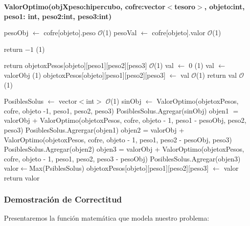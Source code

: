 \documentclass[spanish,12pt]{article}
\begin{document}

\begin{algorithm}[H]{\textbf{ValorOptimo(objXpeso:hipercubo, cofre:vector$<$tesoro$>$, objeto:int, peso1: int, peso2:int, peso3:int)}}
	\begin{algorithmic}[1]
		\State  pesoObj $\gets$ cofre[objeto].peso \Comment $\mathcal{O}$(1)
		\State  pesoVal $\gets$ cofre[objeto].valor \Comment $\mathcal{O}$(1)

			\State return $-1$ \Comment {}(1)

		\EndIf

			\State return objetoxPesos[objeto][peso1][peso2][peso3] \Comment $\mathcal{O}$(1)
		\EndIf
			\State val $\gets$ 0 \Comment {}(1)
				\State val $\gets$ valorObj \Comment {}(1)
				\State objetoxPesos[objeto][peso1][peso2][peso3] $\gets$ val \Comment $\mathcal{O}$(1)
				\State return val \Comment $\mathcal{O}$(1)
			\EndIf

		\Else
			\State PosiblesSolus $\gets$ vector$<$int$>$ \Comment $\mathcal{O}$(1)
			\State sinObj $\gets$ ValorOptimo(objetoxPesos, cofre, objeto -1, peso1, peso2, peso3)
			\State PosiblesSolus.Agregar(sinObj)
				\State objen1 $=$ valorObj + ValorOptimo(objetoxPesos, cofre, objeto - 1, peso1 - pesoObj, peso2, peso3)
				\State PosiblesSolus.Agrergar(objen1)
			\EndIf
				\State objen2 = valorObj + ValorOptimo(objetoxPesos, cofre, objeto - 1, peso1, peso2  - pesoObj, peso3)
				\State PosiblesSolus.Agregar(objen2)
			\EndIf
				\State objen3 = valorObj + ValorOptimo(objetoxPesos, cofre, objeto - 1, peso1, peso2, peso3  - pesoObj)
				\State PosiblesSolus.Agregar(objen3)
			\EndIf
			\State valor$\gets$Max(PsiblesSolus)
			\State objetoxPesos[objeto][peso1][peso2][peso3] $\gets$ valor
			\State return valor
		\EndIf


	\end{algorithmic}
\end{algorithm}

\newpage

\subsubsection{Demostración de Correctitud}
Presentaremos la función matemática que modela nuestro problema:\\
\end{document}
